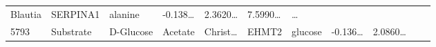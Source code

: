 \documentclass[
]{article}
\begin{document}
\begin{longtable}[]{@{}lllllllllll@{}}
\begin{minipage}[t]{0.07\columnwidth}
Blautia\strut
\end{minipage} & \begin{minipage}[t]{0.07\columnwidth}\raggedright
SERPINA1\strut
\end{minipage} & \begin{minipage}[t]{0.09\columnwidth}\raggedright
alanine\strut
\end{minipage} & \begin{minipage}[t]{0.07\columnwidth}\raggedright
-0.138\ldots{}\strut
\end{minipage} & \begin{minipage}[t]{0.07\columnwidth}\raggedright
2.3620\ldots{}\strut
\end{minipage} & \begin{minipage}[t]{0.07\columnwidth}\raggedright
7.5990\ldots{}\strut
\end{minipage} & \begin{minipage}[t]{0.03\columnwidth}\raggedright
\ldots{}\strut
\end{minipage}\tabularnewline
\begin{minipage}[t]{0.05\columnwidth}\raggedright
5793\strut
\end{minipage} & \begin{minipage}[t]{0.07\columnwidth}\raggedright
Substrate\strut
\end{minipage} & \begin{minipage}[t]{0.07\columnwidth}\raggedright
D-Glucose\strut
\end{minipage} & \begin{minipage}[t]{0.09\columnwidth}\raggedright
Acetate\strut
\end{minipage} & \begin{minipage}[t]{0.07\columnwidth}\raggedright
Christ\ldots{}\strut
\end{minipage} & \begin{minipage}[t]{0.07\columnwidth}\raggedright
EHMT2\strut
\end{minipage} & \begin{minipage}[t]{0.09\columnwidth}\raggedright
glucose\strut
\end{minipage} & \begin{minipage}[t]{0.07\columnwidth}\raggedright
-0.136\ldots{}\strut
\end{minipage} & \begin{minipage}[t]{0.07\columnwidth}\raggedright
2.0860\ldots{}\strut
\end{minipage} & \begin{minipage}[t]{0.07\columnwidth}\raggedright

\end{minipage}
\end{longtable}
\end{document}
